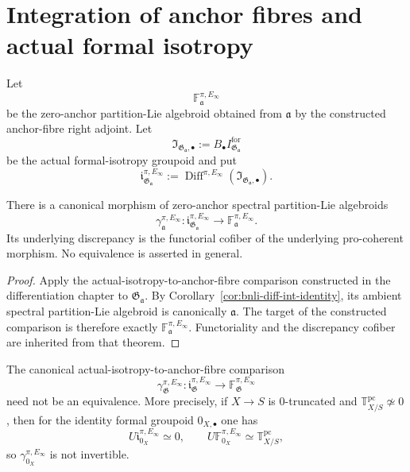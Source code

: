 \section{Integration of anchor fibres and actual formal isotropy}
\label{sec:bnli-isotropy-integration}

Let
\[
    \mathbb F^{\pi,E_\infty}_{\mathfrak a}
\]
be the zero-anchor partition-Lie algebroid obtained from \(\mathfrak a\) by
the constructed anchor-fibre right adjoint.  Let
\[
    \mathfrak I_{\mathfrak G_{\mathfrak a},\bullet}
    :=
    B_\bullet I^{\mathrm{for}}_{\mathfrak G_{\mathfrak a}}
\]
be the actual formal-isotropy groupoid and put
\[
    \mathfrak i^{\pi,E_\infty}_{\mathfrak G_{\mathfrak a}}
    :=
    \operatorname{Diff}^{\pi,E_\infty}
    \left(
      \mathfrak I_{\mathfrak G_{\mathfrak a},\bullet}
    \right).
\]

\begin{theorem}
\label{thm:bnli-integrated-isotropy-comparison}
There is a canonical morphism of zero-anchor spectral partition-Lie
algebroids
\[
\boxed{
    \gamma^{\pi,E_\infty}_{\mathfrak a}:
    \mathfrak i^{\pi,E_\infty}_{\mathfrak G_{\mathfrak a}}
    \longrightarrow
    \mathbb F^{\pi,E_\infty}_{\mathfrak a}.}
\]
Its underlying discrepancy is the functorial cofiber of the underlying
pro-coherent morphism.  No equivalence is asserted in general.
\end{theorem}

\begin{proof}
Apply the actual-isotropy-to-anchor-fibre comparison constructed in the
differentiation chapter to
\(\mathfrak G_{\mathfrak a}\).  By
Corollary~\ref{cor:bnli-diff-int-identity}, its ambient spectral
partition-Lie algebroid is canonically \(\mathfrak a\).  The target of the
constructed comparison is therefore exactly
\(\mathbb F^{\pi,E_\infty}_{\mathfrak a}\).  Functoriality and the discrepancy
cofiber are inherited from that theorem.
\end{proof}

\begin{proposition}
\label{prop:bnli-isotropy-nonidentification}
The canonical actual-isotropy-to-anchor-fibre comparison
\[
    \gamma^{\pi,E_\infty}_{\mathfrak G}:
    \mathfrak i^{\pi,E_\infty}_{\mathfrak G}
    \longrightarrow
    \mathbb F^{\pi,E_\infty}_{\mathfrak G}
\]
need not be an equivalence.  More precisely, if $X\to S$ is $0$-truncated and
$\mathbb T^{\mathrm{pc}}_{X/S}\not\simeq0$, then for the identity formal
groupoid $0_{X,\bullet}$ one has
\[
    U\mathfrak i^{\pi,E_\infty}_{0_X}\simeq0,
    \qquad
    U\mathbb F^{\pi,E_\infty}_{0_X}
    \simeq
    \mathbb T^{\mathrm{pc}}_{X/S},
\]
so $\gamma^{\pi,E_\infty}_{0_X}$ is not invertible.
\end{proposition}

